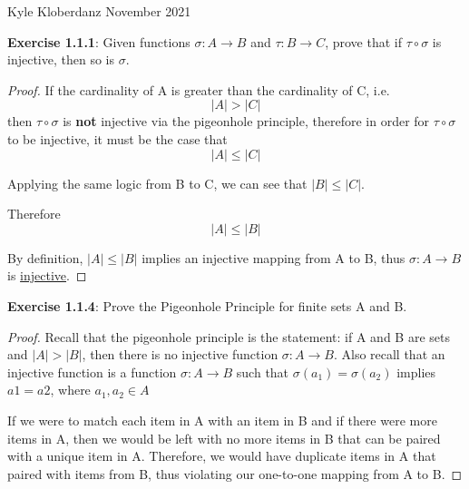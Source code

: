 \documentclass[a4paper]{article}
\begin{document}
\begin{myparindent}{0pt}

Kyle Kloberdanz  November 2021 \newline

\textbf{Exercise 1.1.1}:
Given functions $\sigma: A \rightarrow B$ and $\tau: B \rightarrow C$,
prove that if $\tau \circ \sigma$ is injective, then so is $\sigma$.

\begin{proof}
If the cardinality of A is greater than the cardinality of C, i.e.
\[|A| > |C|\]
then $\tau \circ \sigma$ is \textbf{not} injective via the
pigeonhole principle, therefore in order for $\tau \circ \sigma$ to be
injective, it must be the case that
\[|A| \le |C|\]

Applying the same logic from B to C, we can see that $|B| \le |C|$.

Therefore
\[|A| \le |B|\]

By definition, $|A| \le |B|$ implies an injective mapping from A to B,\newline
thus $\sigma: A \rightarrow B$ is \underline{injective}.
\end{proof}

\textbf{Exercise 1.1.4}:
Prove the Pigeonhole Principle for finite sets A and B.

\begin{proof}
Recall that the pigeonhole principle is the statement: if A and B are sets and
$|A| > |B|$, then there is no injective function $\sigma: A \rightarrow B$.
\newline
\newline
 Also recall that an injective function is a function
 $\sigma: A \rightarrow B$ such that
$\sigma(a_1) = \sigma(a_2)$ implies $a1 = a2$, where $a_1, a_2 \in A$
\newline

If we were to match each item in A with an item in B and if there were more
items in A, then we would be left with no more items in B that can be paired
with a unique item in A. Therefore, we would have duplicate items in A that
paired with items from B, thus violating our one-to-one mapping from A to B.
\end{proof}

\end{myparindent}
\end{document}
